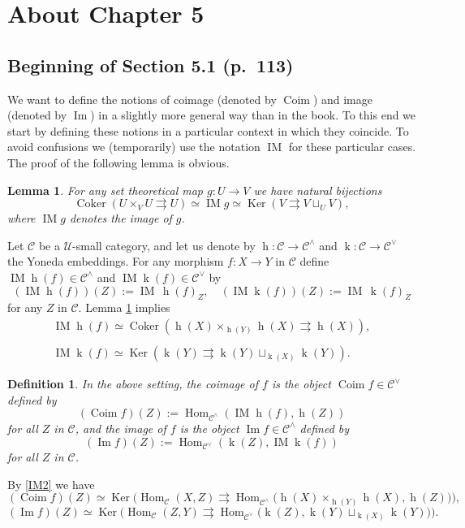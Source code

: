 \documentclass[12pt]{article}
\newtheorem{lem}[thm]{Lemma}
\newtheorem{df}[thm]{Definition}%
\theoremstyle{remark}
\theoremstyle{definition}
\newcommand{\C}{\mathcal C}
\newcommand{\U}{\mathcal U}
\newcommand{\parar}{\rightrightarrows}\newcommand{\paralelarrows}{\rightrightarrows}%
\DeclareMathOperator{\Coim}{Coim}
\DeclareMathOperator{\Coker}{Coker}
\DeclareMathOperator{\Ima}{Im}
\DeclareMathOperator{\IM}{IM}
\DeclareMathOperator{\hy}{h}
\DeclareMathOperator{\ky}{k}
\DeclareMathOperator{\Hom}{Hom}%
\DeclareMathOperator{\Ker}{Ker}
\begin{document}
\section{About Chapter 5}
%
\subsection{Beginning of Section 5.1 (p.~113)} %
%
We want to define the notions of coimage (denoted by $\Coim$) and image (denoted by $\Ima$) in a slightly more general way than in the book. To this end we start by defining these notions in a particular context in which they coincide. To avoid confusions we (temporarily) use the notation $\IM$ for these particular cases. The proof of the following lemma is obvious. 
%
\begin{lem}\label{imset} 
For any set theoretical map $g:U\to V$ we have natural bijections 
$$ 
\Coker(U\times_VU\parar U)\simeq\IM g\simeq\Ker(V\parar V\sqcup_UV),
$$ 
where $\IM g$ denotes the image of $g$. 
\end{lem} 

Let $\C$ be a $\U$-small category, and let us denote by $\hy:\C\to\C^\wedge$ and $\ky:\C\to\C^\vee$ the Yoneda embeddings. For any morphism $f:X\to Y$ in $\C$ define $\IM\hy(f)\in\C^\wedge$ and $\IM\ky(f)\in\C^\vee$ by
$$
(\IM\hy(f))(Z):=\IM\,\hy(f)_Z,\quad(\IM\ky(f))(Z):=\IM\,\ky(f)_Z 
$$
for any $Z$ in $\C$. Lemma \ref{imset} implies
%
\begin{equation}\label{IM2}
\begin{split}
\IM\hy(f)\simeq\Coker(\hy(X)\times_{\hy(Y)}\hy(X)\parar\hy(X)),\\ \\ 
\IM\ky(f)\simeq\Ker(\ky(Y)\parar\ky(Y)\sqcup_{\ky(X)}\ky(Y)).
\end{split}
\end{equation}
%
\begin{df} 
In the above setting, the {\em coimage} of $f$ is the object $\Coim f\in\C^\vee$ defined by 
$$ 
(\Coim f)(Z):=\Hom_{\C^\wedge}(\IM\hy(f),\hy(Z))
$$ 
for all $Z$ in $\C$, and the {\em image} of $f$ is the object $\Ima f\in\C^\wedge$ defined by 
$$ 
(\Ima f)(Z):=\Hom_{\C^\vee}(\ky(Z),\IM\ky(f)) 
$$ 
for all $Z$ in $\C$. 
\end{df} 
%

By \eqref{IM2} we have 
$$ 
(\Coim f)(Z)\simeq\Ker\Big(\Hom_\C(X,Z)\parar\Hom_{\C^\wedge}\big(\hy(X)\times_{\hy(Y)}\hy(X),\hy(Z)\big)\Big), 
$$ 
$$ 
(\Ima f)(Z)\simeq\Ker\Big(\Hom_\C(Z,Y)\parar\Hom_{\C^\vee}\big(\ky(Z),\ky(Y)\sqcup_{\ky(X)}\ky(Y)\big)\Big). 
$$
 
\end{document}
